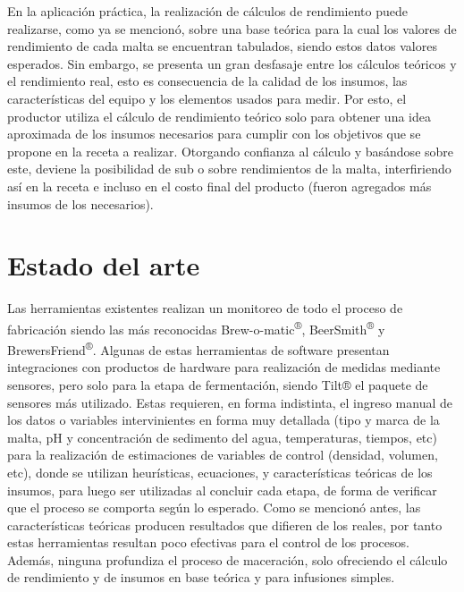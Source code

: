     \par
    En la aplicación práctica, la realización de cálculos de rendimiento puede realizarse, como ya se mencionó, sobre una base teórica para la cual los valores de rendimiento de cada malta se encuentran tabulados, siendo estos datos valores esperados. Sin embargo, se presenta un gran desfasaje entre los cálculos teóricos y el rendimiento real, esto es consecuencia de la calidad de los insumos, las características del equipo y los elementos usados para medir. Por esto, el productor utiliza el cálculo de rendimiento teórico solo para obtener una idea aproximada de los insumos necesarios para cumplir con los objetivos que se propone en la receta a realizar. Otorgando confianza al cálculo y basándose sobre este, deviene la posibilidad de sub o sobre rendimientos de la malta, interfiriendo así en la receta e incluso en el costo final del producto (fueron agregados más insumos de los necesarios).
    

\section{Estado del arte}
    \par
    Las herramientas existentes realizan un monitoreo de todo el proceso de fabricación siendo las más reconocidas Brew-o-matic\textsuperscript{®}, BeerSmith\textsuperscript{®} y BrewersFriend\textsuperscript{®}. Algunas de estas herramientas de software presentan integraciones con productos de hardware para realización de medidas mediante sensores, pero solo para la etapa de fermentación, siendo Tilt® el paquete de sensores más utilizado. Estas requieren, en forma indistinta, el ingreso manual de los datos o variables intervinientes en forma muy detallada (tipo y marca de la malta, pH y concentración de sedimento del agua, temperaturas, tiempos, etc) para la realización de estimaciones de variables de control (densidad, volumen, etc), donde se utilizan heurísticas, ecuaciones, y características teóricas de los insumos, para luego ser utilizadas al concluir cada etapa, de forma de verificar que el proceso se comporta según lo esperado. Como se mencionó antes, las características teóricas producen resultados que difieren de los reales, por tanto estas herramientas resultan poco efectivas para el control de los procesos. Además, ninguna profundiza el proceso de maceración, solo ofreciendo el cálculo de rendimiento y de insumos en base teórica y para infusiones simples.

